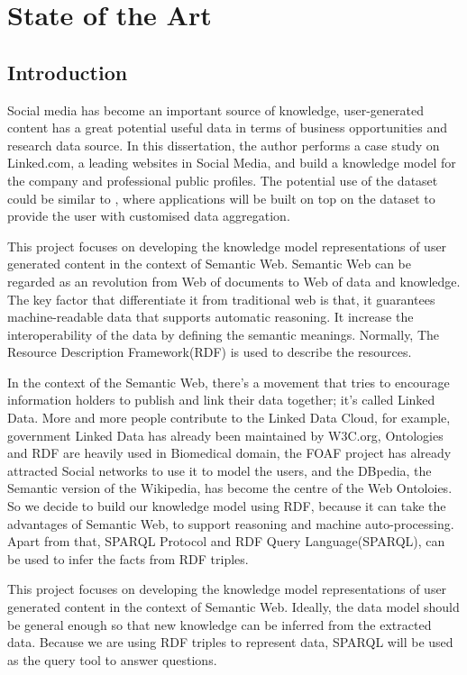 \chapter{State of the Art}

\section{Introduction}

Social media has become an important source of knowledge, user-generated content has a great potential useful data in terms of business opportunities and research data source. In this dissertation, the author performs a case study on Linked.com, a leading websites in Social Media, and build a knowledge model for the company and professional public profiles. The potential use of the dataset could be similar to \cite{li2012}, where applications will be built on top on the dataset to provide the user with customised data aggregation.

This project focuses on developing the knowledge model representations of user generated content in the context of Semantic Web. Semantic Web can be regarded as an revolution from Web of documents to Web of data and knowledge.\cite{shadbolt2006} The key factor that differentiate it from traditional web is that, it guarantees machine-readable data that supports automatic reasoning. It increase the interoperability of the data by defining the semantic meanings. Normally, The Resource Description Framework(RDF) is used to describe the resources.

In the context of the Semantic Web, there's a movement that tries to encourage information holders to publish and link their data together; it's called Linked Data. More and more people contribute to the Linked Data Cloud\cite{bizer2009}, for example, government Linked Data has already been maintained by W3C.org, Ontologies and RDF are heavily used in Biomedical domain, the FOAF project has already attracted Social networks to use it to model the users, and the DBpedia, the Semantic version of the Wikipedia, has become the centre of the Web Ontoloies\cite{auer2007}. So we decide to build our knowledge model using RDF, because it can take the advantages of Semantic Web, to support reasoning and machine auto-processing. Apart from that, SPARQL Protocol and RDF Query Language(SPARQL), can be used to infer the facts from RDF triples.

This project focuses on developing the knowledge model representations of user generated content in the context of Semantic Web. Ideally, the data model should be general enough so that new knowledge can be inferred from the extracted data. Because we are using RDF triples to represent data, SPARQL will be used as the query tool to answer questions.

